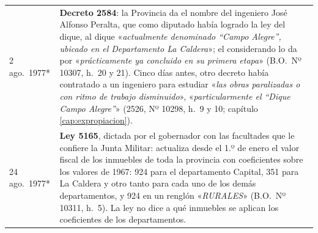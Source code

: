 \begin{longtable}{@{}p{2.7cm}p{10.3cm}@{}}
2 ago.\ 1977* & \textbf{Decreto 2584}: la Provincia da el nombre del ingeniero José Alfonso Peralta, que como diputado había logrado la ley del dique, al dique «\textit{actualmente denominado ``Campo Alegre'', ubicado en el Departamento La Caldera}»; el considerando lo da por «\textit{prácticamente ya concluido en su primera etapa}» (B.O.\ Nº 10307, h.\ 20 y 21). Cinco días antes, otro decreto había contratado a un ingeniero para estudiar «\textit{las obras paralizadas o con ritmo de trabajo disminuido}», «\textit{particularmente el ``Dique Campo Alegre''}» (2526, Nº 10298, h.\ 9 y 10; capítulo \ref{cap:expropiacion}). \\
24 ago.\ 1977* & \textbf{Ley 5165}, dictada por el gobernador con las facultades que le confiere la Junta Militar: actualiza desde el 1.º de enero el valor fiscal de los inmuebles de toda la provincia con coeficientes sobre los valores de 1967: 924 para el departamento Capital, 351 para La Caldera y otro tanto para cada uno de los demás departamentos, y 924 en un renglón «\textit{RURALES}» (B.O.\ Nº 10311, h.\ 5). La ley no dice a qué inmuebles se aplican los coeficientes de los departamentos. \\

\end{longtable}
